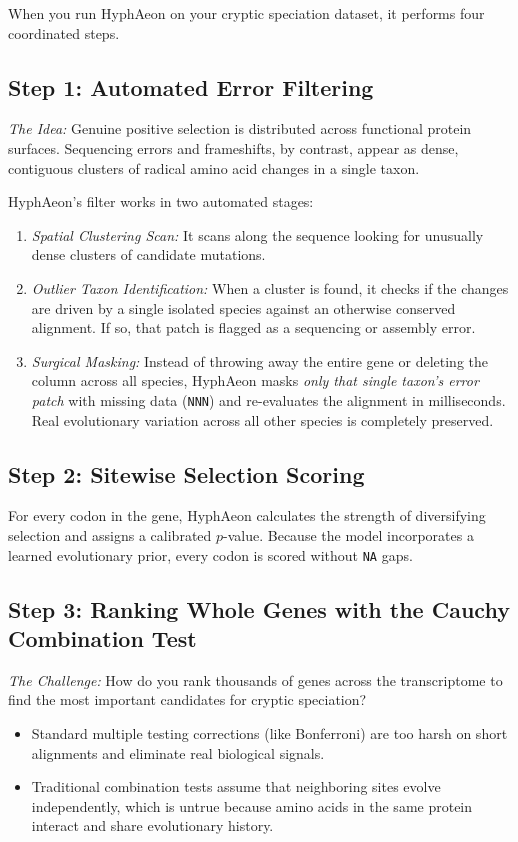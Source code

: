 \documentclass[11pt,a4paper]{article}
\begin{document}
When you run HyphAeon on your cryptic speciation dataset, it performs four coordinated steps.

\subsection{Step 1: Automated Error Filtering}
\textit{The Idea:} Genuine positive selection is distributed across functional protein surfaces. Sequencing errors and frameshifts, by contrast, appear as dense, contiguous clusters of radical amino acid changes in a single taxon.

HyphAeon's filter works in two automated stages:
\begin{enumerate}
    \item \textit{Spatial Clustering Scan:} It scans along the sequence looking for unusually dense clusters of candidate mutations.
    \item \textit{Outlier Taxon Identification:} When a cluster is found, it checks if the changes are driven by a single isolated species against an otherwise conserved alignment. If so, that patch is flagged as a sequencing or assembly error.
    \item \textit{Surgical Masking:} Instead of throwing away the entire gene or deleting the column across all species, HyphAeon masks \textit{only that single taxon's error patch} with missing data (\texttt{NNN}) and re-evaluates the alignment in milliseconds. Real evolutionary variation across all other species is completely preserved.
\end{enumerate}

\subsection{Step 2: Sitewise Selection Scoring}
For every codon in the gene, HyphAeon calculates the strength of diversifying selection and assigns a calibrated $p$-value. Because the model incorporates a learned evolutionary prior, every codon is scored without \texttt{NA} gaps.

\subsection{Step 3: Ranking Whole Genes with the Cauchy Combination Test}
\textit{The Challenge:} How do you rank thousands of genes across the transcriptome to find the most important candidates for cryptic speciation?
\begin{itemize}
    \item Standard multiple testing corrections (like Bonferroni) are too harsh on short alignments and eliminate real biological signals.
    \item Traditional combination tests assume that neighboring sites evolve independently, which is untrue because amino acids in the same protein interact and share evolutionary history.
\end{itemize}
\end{document}
